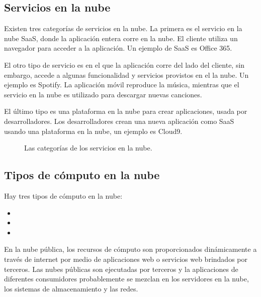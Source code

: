 \subsection{Servicios en la nube}
\label{\detokenize{chapter_one/cloud_computing:servicios-en-la-nube}}
Existen tres categorías de servicios en la nube. La primera es el servicio en la
nube SaaS, donde la aplicación entera corre en la nube. El cliente utiliza un
navegador para acceder a la aplicación. Un ejemplo de SaaS es Office 365.

El otro tipo de servicio es en el que la aplicación corre del lado del cliente,
sin embargo, accede a algunas funcionalidad y servicios provistos en el la nube.
Un ejemplo es Spotify. La aplicación móvil reproduce la música, mientras que el
servicio en la nube es utilizado para descargar nuevas canciones.

El último tipo es una plataforma en la nube para crear aplicaciones, usada por
desarrolladores. Los desarrolladores crean una nueva aplicación como SaaS  usando
una plataforma en la nube, un ejemplo es Cloud9.

\begin{figure}[ht]
\centering
\capstart

\noindent{}
\caption{Las categorías de los servicios en la nube.}\label{\detokenize{chapter_one/cloud_computing:c-s-categories}}\end{figure}


\subsection{Tipos de cómputo en la nube}
\label{\detokenize{chapter_one/cloud_computing:tipos-de-computo-en-la-nube}}
Hay tres tipos de cómputo en la nube:
\begin{itemize}
\item {} 

\item {} 

\item {} 

\end{itemize}

En la nube pública, los recursos de cómputo son proporcionados dinámicamente a
través de internet por medio de aplicaciones web o servicios web brindados por
terceros. Las nubes públicas son ejecutadas por terceros y la aplicaciones de
diferentes consumidores probablemente se mezclan en los servidores en la nube,
los sistemas de almacenamiento y las redes.

